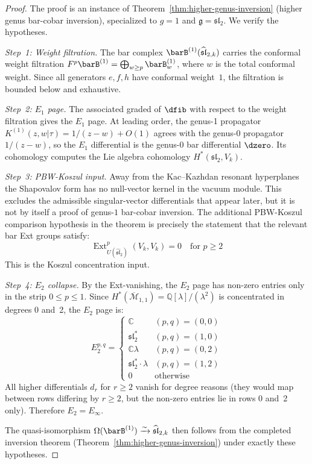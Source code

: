 \begin{proof}
The proof is an instance of Theorem~\ref{thm:higher-genus-inversion} (higher genus bar-cobar inversion), specialized to $g=1$ and $\mathfrak{g} = \mathfrak{sl}_2$. We verify the hypotheses.

\emph{Step~1: Weight filtration.}
The bar complex $\barB^{(1)}(\widehat{\mathfrak{sl}}_{2,k})$ carries the conformal weight filtration $F^p\barB^{(1)} = \bigoplus_{w \geq p} \barB^{(1)}_w$, where $w$ is the total conformal weight. Since all generators $e, f, h$ have conformal weight~$1$, the filtration is bounded below and exhaustive.

\emph{Step~2: $E_1$ page.}
The associated graded of $\dfib$ with respect to the weight filtration gives the $E_1$ page. At leading order, the genus-1 propagator $K^{(1)}(z,w|\tau) = 1/(z-w) + O(1)$ agrees with the genus-0 propagator $1/(z-w)$, so the $E_1$ differential is the genus-0 bar differential $\dzero$. Its cohomology computes the Lie algebra cohomology $H^*(\mathfrak{sl}_2, V_k)$.

\emph{Step~3: PBW-Koszul input.}
Away from the Kac--Kazhdan resonant hyperplanes the Shapovalov form has
no null-vector kernel in the vacuum module.  This excludes the
admissible singular-vector differentials that appear later, but it is
not by itself a proof of genus-$1$ bar-cobar inversion.  The additional
PBW-Koszul comparison hypothesis in the theorem is precisely the
statement that the relevant bar Ext groups satisfy:
\begin{equation}
\operatorname{Ext}^p_{U(\widehat{\mathfrak{sl}}_2)}(V_k, V_k) = 0 \quad \text{for } p \geq 2
\end{equation}
This is the Koszul concentration input.

\emph{Step~4: $E_2$ collapse.}
By the Ext-vanishing, the $E_2$ page has non-zero entries only in the strip $0 \leq p \leq 1$. Since $H^*(\overline{\mathcal{M}}_{1,1}) = \mathbb{Q}[\lambda]/(\lambda^2)$ is concentrated in degrees 0 and~2, the $E_2$ page is:
\begin{equation}
E_2^{p,q} = \begin{cases}
\mathbb{C} & (p,q) = (0,0) \\
\mathfrak{sl}_2^* & (p,q) = (1,0) \\
\mathbb{C}\lambda & (p,q) = (0,2) \\
\mathfrak{sl}_2^* \cdot \lambda & (p,q) = (1,2) \\
0 & \text{otherwise}
\end{cases}
\end{equation}
All higher differentials $d_r$ for $r \geq 2$ vanish for degree reasons (they would map between rows differing by $r \geq 2$, but the non-zero entries lie in rows 0 and~2 only). Therefore $E_2 = E_\infty$.

The quasi-isomorphism $\Omega(\barB^{(1)}) \xrightarrow{\sim} \widehat{\mathfrak{sl}}_{2,k}$ then follows from the completed inversion theorem (Theorem~\ref{thm:higher-genus-inversion}) under exactly these hypotheses.
\end{proof}

